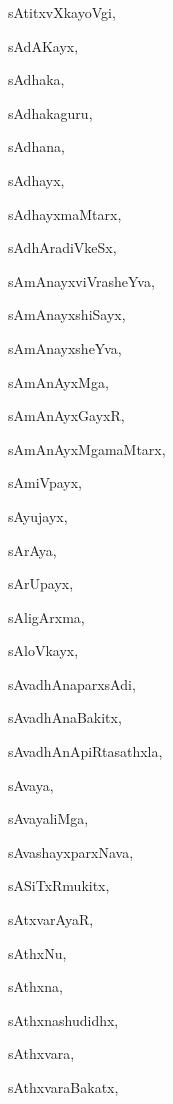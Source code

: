 \begin{multicols}{2}
{sAtitxvXkayoVgi}, \pageref{sAtitxvXkayoVgi}

{sAdAKayx}, \pageref{sAdAKayx}

{sAdhaka}, \pageref{sAdhaka}

{sAdhakaguru}, \pageref{sAdhakaguru}

{sAdhana}, \pageref{sAdhana}

{sAdhayx}, \pageref{sAdhayx}

{sAdhayxmaMtarx}, \pageref{sAdhayxmaMtarx}

{sAdhAradiVkeSx}, \pageref{sAdhAradiVkeSx}

{sAmAnayxviVrasheYva}, \pageref{sAmAnayxviVrasheYva}

{sAmAnayxshiSayx}, \pageref{sAmAnayxshiSayx}

{sAmAnayxsheYva}, \pageref{sAmAnayxsheYva}

{sAmAnAyxMga}, \pageref{sAmAnAyxMga}

{sAmAnAyxGayxR}, \pageref{sAmAnAyxGayxR}

{sAmAnAyxMgamaMtarx}, \pageref{sAmAnAyxMgamaMtarx}

{sAmiVpayx}, \pageref{sAmiVpayx}

{sAyujayx}, \pageref{sAyujayx}

{sArAya}, \pageref{sArAya}

{sArUpayx}, \pageref{sArUpayx}

{sAligArxma}, \pageref{sAligArxma}

{sAloVkayx}, \pageref{sAloVkayx}

{sAvadhAnaparxsAdi}, \pageref{sAvadhAnaparxsAdi}

{sAvadhAnaBakitx}, \pageref{sAvadhAnaBakitx}

{sAvadhAnApiRtasathxla}, \pageref{sAvadhAnApiRtasathxla}

{sAvaya}, \pageref{sAvaya}

{sAvayaliMga}, \pageref{sAvayaliMga}

{sAvashayxparxNava}, \pageref{sAvashayxparxNava}

{sASiTxRmukitx}, \pageref{sASiTxRmukitx}

{sAtxvarAyaR}, \pageref{sAtxvarAyaR}

{sAthxNu}, \pageref{sAthxNu}

{sAthxna}, \pageref{sAthxna}

{sAthxnashudidhx}, \pageref{sAthxnashudidhx}

{sAthxvara}, \pageref{sAthxvara}

{sAthxvaraBakatx}, \pageref{sAthxvaraBakatx}


\end{multicols}
